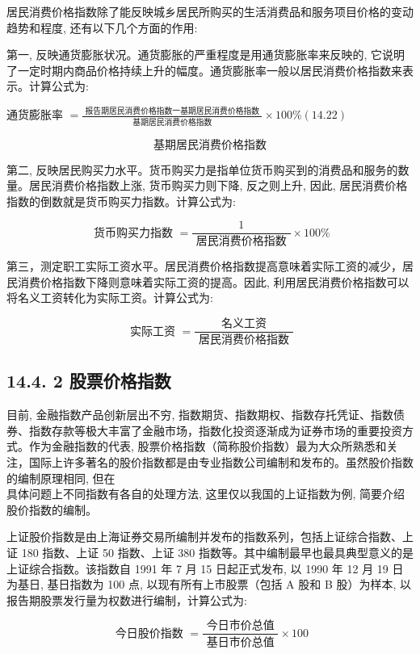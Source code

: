 \documentclass[10pt]{article}
\begin{document}
\begin{CJK*}{UTF8}{bsmi}
居民消费价格指数除了能反映城乡居民所购买的生活消费品和服务项目价格的变动趋势和程度, 还有以下几个方面的作用:

第一, 反映通货膨胀状况。通货膨胀的严重程度是用通货膨胀率来反映的, 它说明了一定时期内商品价格持续上升的幅度。通货膨胀率一般以居民消费价格指数来表示。计算公式为:

通货膨胀率 $=\frac{\text { 报告期居民消费价格指数一基期居民消费价格指数 }}{\text { 基期居民消费价格指数 }} \times 100 \%(14.22)$

$$
\text { 基期居民消费价格指数 }
$$

第二, 反映居民购买力水平。货币购买力是指单位货币购买到的消费品和服务的数量。居民消费价格指数上涨, 货币购买力则下降, 反之则上升, 因此, 居民消费价格指数的倒数就是货币购买力指数。计算公式为:


\begin{equation*}
\text { 货币购买力指数 }=\frac{1}{\text { 居民消费价格指数 }} \times 100 \% \tag{14.23}
\end{equation*}


第三，测定职工实际工资水平。居民消费价格指数提高意味着实际工资的减少，居民消费价格指数下降则意味着实际工资的提高。因此, 利用居民消费价格指数可以将名义工资转化为实际工资。计算公式为:


\begin{equation*}
\text { 实际工资 }=\frac{\text { 名义工资 }}{\text { 居民消费价格指数 }} \tag{14.24}
\end{equation*}


\subsection*{14.4. 2 股票价格指数}
目前, 金融指数产品创新层出不穷, 指数期货、指数期权、指数存托凭证、指数债券、指数存款等极大丰富了金融市场，指数化投资逐渐成为证券市场的重要投资方式。作为金融指数的代表, 股票价格指数（简称股价指数）最为大众所熟悉和关注，国际上许多著名的股价指数都是由专业指数公司编制和发布的。虽然股价指数的编制原理相同, 但在\\
具体问题上不同指数有各自的处理方法, 这里仅以我国的上证指数为例, 简要介绍股价指数的编制。

上证股价指数是由上海证券交易所编制并发布的指数系列，包括上证综合指数、上证 180 指数、上证 50 指数、上证 380 指数等。其中编制最早也最具典型意义的是上证综合指数。该指数自 1991 年 7 月 15 日起正式发布, 以 1990 年 12 月 19 日为基日, 基日指数为 100 点, 以现有所有上市股票（包括 A 股和 B 股）为样本, 以报告期股票发行量为权数进行编制，计算公式为:


\begin{equation*}
\text { 今日股价指数 }=\frac{\text { 今日市价总值 }}{\text { 基日市价总值 }} \times 100 \tag{14.25}
\end{equation*}



\end{CJK*}
\end{document}

